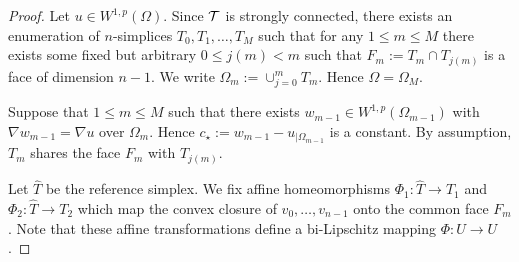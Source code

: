 \documentclass[a4paper]{article}
\begin{document}
\begin{proof}
    Let $u \in W^{1,p}(\Omega)$. 
    Since ${\mathcal T}$ is strongly connected, there exists an enumeration of $n$-simplices $T_0, T_1, \dots, T_M$ such that for any $1 \leq m \leq M$ there exists some fixed but arbitrary $0 \leq j(m) < m$ such that $F_m := T_m \cap T_{j(m)}$ is a face of dimension $n-1$. We write $\Omega_m := \cup_{j=0}^{m} T_m$. Hence $\Omega = \Omega_M$. 
    
    Suppose that $1 \leq m \leq M$ such that there exists $w_{m-1} \in W^{1,p}(\Omega_{m-1})$ with $\nabla w_{m-1} = \nabla u$ over $\Omega_m$. Hence $c_{\star} := w_{m-1} - u_{|\Omega_{m-1}}$ is a constant. 
    By assumption, $T_{m}$ shares the face $F_{m}$ with $T_{j(m)}$. 

    Let $\hat T$ be the reference simplex.
    We fix affine homeomorphisms $\Phi_1 : \hat T \rightarrow T_1$ and $\Phi_2 : \hat T \rightarrow T_2$
    which map the convex closure of $v_0, \dots, v_{n-1}$ onto the common face $F_{m}$.
    Note that these affine transformations define a bi-Lipschitz mapping $\Phi : \hat U \rightarrow U$. 
    

\end{proof}
\end{document}

